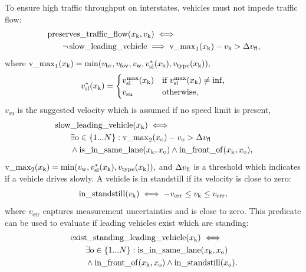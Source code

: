 To ensure high traffic throughput on interstates, vehicles must not impede traffic flow:
\begin{align*}
\begin{split}
&\operatorname*{preserves\_traffic\_flow}(x_\text{k}, v_\mathrm{k}) \iff \\ 
& \qquad \neg \operatorname*{slow\_leading\_vehicle} \implies  \mathrm{v\_max}_1(x_\text{k}) - v_\mathrm{k}  > \Delta v_\text{fl},
\end{split}
\end{align*}
where $\mathrm{v\_max}_1(x_\text{k}) = \min(v_\text{br}, v_\text{fov}, v_\text{w}, v_\mathrm{sl}^{*}(x_\text{k}), v_\text{type}(x_\text{k})),$
\begin{align*}
v_\mathrm{sl}^{*}(x_\text{k}) =
\begin{cases} 
v_\text{sl}^\text{max}(x_\text{k}) & \text{if } v_\text{sl}^\text{max}(x_\text{k}) \neq \inf, \\ 
v_\mathrm{su} & \text{otherwise},
\end{cases}	
\end{align*}
$v_\mathrm{su}$ is the suggested velocity which is assumed if no speed limit is present,
\begin{align*}
\begin{split}
&\operatorname*{slow\_leading\_vehicle}(x_\text{k}) \iff \\
& \qquad \exists \text{o} \in \{1...N\}: \mathrm{v\_max}_2(x_\text{o}) - v_\text{o} > \Delta v_\text{fl}  \\
& \qquad \land \operatorname*{is\_in\_same\_lane}(x_\text{k}, x_\text{o}) \land \operatorname*{in\_front\_of}(x_\text{k}, x_\text{o}),
\end{split}
\end{align*}
$\mathrm{v\_max}_2(x_\text{k}) = \min(v_\text{w}, v_\mathrm{sl}^{*}(x_\text{k}), v_\text{type}(x_\text{k})),$
and $\Delta v_\text{fl}$ is a threshold which indicates if a vehicle drives slowly.
A vehicle is in standstill if its velocity is close to zero:
\begin{align*}
\begin{split}
\operatorname*{in\_standstill}(v_\mathrm{k}) \iff -v_\text{err}  \leq v_\mathrm{k} \leq v_\text{err}, 
\end{split}
\end{align*}
where $v_\mathrm{err}$ captures measurement uncertainties and is close to zero.
This predicate can be used to evaluate if leading vehicles exist which are standing:
\begin{align*}
\begin{split}
& \operatorname*{exist\_standing\_leading\_vehicle}(x_\text{k}) \iff \\
&  \qquad\exists \text{o} \in \{1...N\}:  \operatorname*{is\_in\_same\_lane}(x_\text{k}, x_\text{o}) \\
& \qquad \land \operatorname*{in\_front\_of}(x_\text{k}, x_\text{o}) \land \operatorname*{in\_standstill}(x_\text{o}).
\end{split}
\end{align*}
